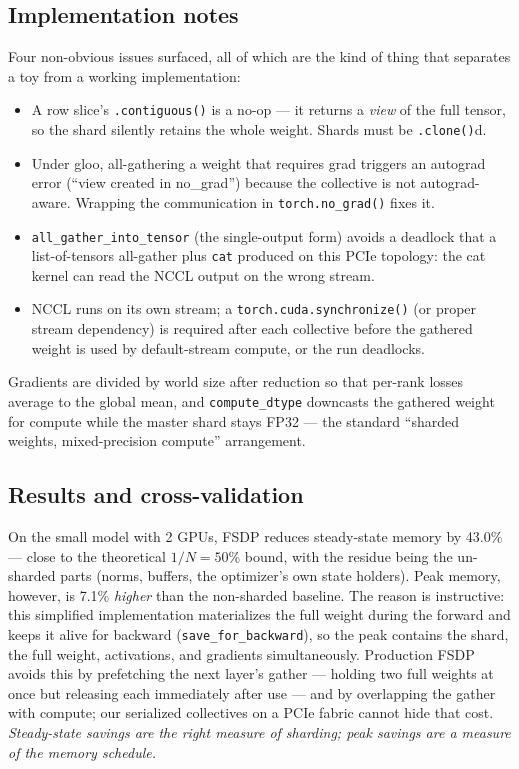\documentclass{article}
\begin{document}
\subsection{Implementation notes}

Four non-obvious issues surfaced, all of which are the kind of thing that separates a toy from a working implementation:

\begin{itemize}
  \item A row slice's \texttt{.contiguous()} is a no-op --- it returns a \emph{view} of the full tensor, so the shard silently retains the whole weight. Shards must be \texttt{.clone()}d.
  \item Under gloo, all-gathering a weight that requires grad triggers an autograd error (``view created in no\_grad'') because the collective is not autograd-aware. Wrapping the communication in \texttt{torch.no\_grad()} fixes it.
  \item \texttt{all\_gather\_into\_tensor} (the single-output form) avoids a deadlock that a list-of-tensors all-gather plus \texttt{cat} produced on this PCIe topology: the cat kernel can read the NCCL output on the wrong stream.
  \item NCCL runs on its own stream; a \texttt{torch.cuda.synchronize()} (or proper stream dependency) is required after each collective before the gathered weight is used by default-stream compute, or the run deadlocks.
\end{itemize}

Gradients are divided by world size after reduction so that per-rank losses average to the global mean, and \texttt{compute\_dtype} downcasts the gathered weight for compute while the master shard stays FP32 --- the standard ``sharded weights, mixed-precision compute'' arrangement.

\subsection{Results and cross-validation}

On the small model with 2 GPUs, FSDP reduces steady-state memory by 43.0\% --- close to the theoretical $1/N=50$\% bound, with the residue being the un-sharded parts (norms, buffers, the optimizer's own state holders). Peak memory, however, is 7.1\% \emph{higher} than the non-sharded baseline. The reason is instructive: this simplified implementation materializes the full weight during the forward and keeps it alive for backward (\texttt{save\_for\_backward}), so the peak contains the shard, the full weight, activations, and gradients simultaneously. Production FSDP avoids this by prefetching the next layer's gather --- holding two full weights at once but releasing each immediately after use --- and by overlapping the gather with compute; our serialized collectives on a PCIe fabric cannot hide that cost. \emph{Steady-state savings are the right measure of sharding; peak savings are a measure of the memory schedule.}
\end{document}
